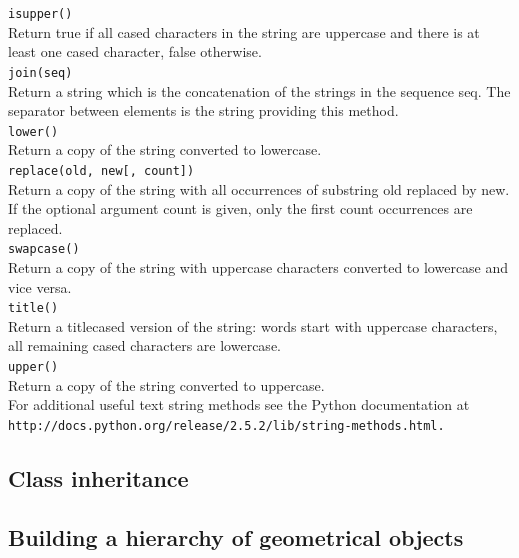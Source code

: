 \noindent
{\tt isupper()}\\
Return true if all cased characters in the string are uppercase and there is at least one cased character, false otherwise.\\

\noindent
{\tt join(seq)}\\
Return a string which is the concatenation of the strings in the sequence seq. The separator between elements is the string providing this method.\\

\noindent
{\tt lower()}\\
Return a copy of the string converted to lowercase.\\

\noindent
{\tt replace(old, new[, count])}\\
Return a copy of the string with all occurrences of substring old replaced by new. 
If the optional argument count is given, only the first count occurrences are replaced.\\

\noindent
{\tt swapcase()}\\
Return a copy of the string with uppercase characters converted to lowercase and vice versa.\\

\noindent
{\tt title()}\\
Return a titlecased version of the string: words start with uppercase characters, 
all remaining cased characters are lowercase.\\


\noindent
{\tt upper()}\\
Return a copy of the string converted to uppercase.\\

\noindent
For additional useful text string methods see the Python documentation at \\
{\tt http://docs.python.org/release/2.5.2/lib/string-methods.html.}

\subsection{Class inheritance}


\subsection{Building a hierarchy of geometrical objects}



